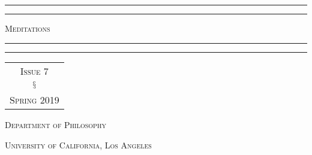 \begin{titlepage} %

	\centering %
	
	\vspace*{\baselineskip} %
	
	
	\rule{\textwidth}{1.6pt}\vspace*{-\baselineskip}\vspace*{2pt} %
	\rule{\textwidth}{0.4pt} %
	
	\vspace{1\baselineskip} %
	
	{\HUGE \scshape{}\selectfont Meditations} %
	
	\vspace{0.5\baselineskip} %
	
	\rule{\textwidth}{0.4pt}\vspace*{-\baselineskip}\vspace{3.2pt} %
	\rule{\textwidth}{1.6pt} %
	
	\vspace{3\baselineskip} %
	
	
	{\LARGE 
		\selectfont 
		\begin{tabular}{c}
		\textsc{Issue 7}
		\vspace{0.75em}
		 \\
		$\mathsection$ 
		\vspace{0.75em}
		\\
	 	\textsc{Spring} 2019
	 	\end{tabular}
	 }
	
	
	\vspace*{3\baselineskip} %
	
	
	\vfill %
	
	
	{\scshape\LARGE Department of Philosophy}
	
	\vspace{0.5\baselineskip} 
	
	{\scshape\large University of California, Los Angeles}

\end{titlepage}

